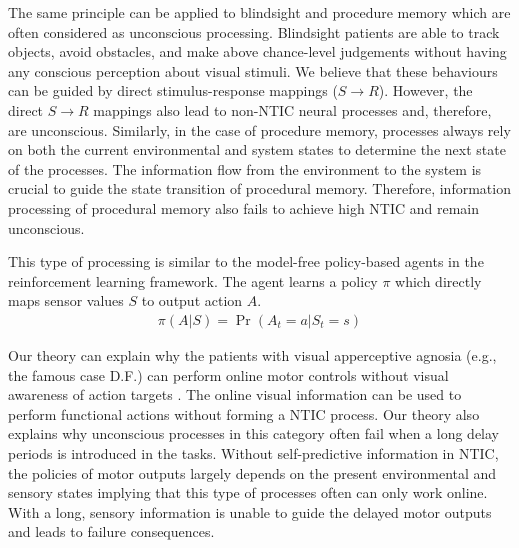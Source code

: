 \documentclass[utf8]{article}
\begin{document}
            The same principle can be applied to blindsight and procedure memory  which are often considered as unconscious processing. Blindsight patients are able to track objects, avoid obstacles, and make above chance-level judgements without having any conscious perception about visual stimuli. We believe that these behaviours can be guided by direct stimulus-response mappings ($S\rightarrow{}R$). However, the direct $S\rightarrow{}R$ mappings also lead to non-NTIC neural processes  and, therefore, are unconscious. Similarly, in the case of procedure memory, processes always rely on both the current environmental and system states to determine the next state of the processes. The information flow from the environment to the system is crucial to guide the state transition of procedural memory. Therefore, information processing of procedural memory also fails to achieve high NTIC and remain unconscious. 
            
             This type of processing is similar to the model-free policy-based agents in the reinforcement learning framework. The agent learns a policy $\pi$ which directly maps sensor values $S$ to output action $A$.
    		\begin{equation}
    			\label{eq:PolicyBasedAgent}
    			\begin{aligned}
    			    \pi(A | S)=\operatorname{Pr}\left(A_{t}=a | S_{t}=s\right)
    			\end{aligned}
    		\end{equation}
    		
    		Our theory can explain why the patients with visual apperceptive agnosia (e.g., the famous case D.F.\cite{james2003ventral}) can perform online motor controls without visual awareness of action targets \citep{10.3389/fneur.2014.00255}. The online visual information can be used to perform functional actions without forming a NTIC process. Our theory also explains why unconscious processes in this category often fail when a long delay periods is introduced in the tasks. Without self-predictive information in NTIC, the policies of motor outputs largely depends on the present environmental and sensory states implying that this type of processes often can only work online. With a long, sensory information is unable to guide the delayed motor outputs and leads to failure consequences. 
    		
\end{document}
